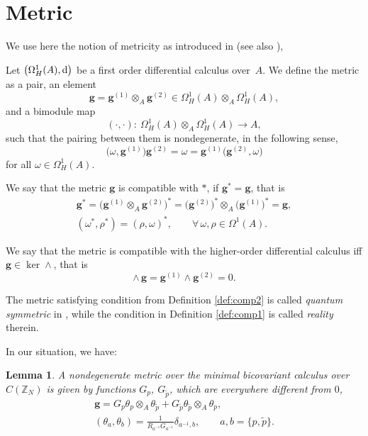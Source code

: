 \documentclass[pdftex]{sigma}
\numberwithin{equation}{section}
\newtheorem{Lemma}[Theorem]{Lemma}
\newcommand{\Z}{\mathbb{Z}}
\newcommand{\ip}{{\tilde{p}}}
\begin{document}
\section{Metric}
We use here the notion of metricity as introduced in \cite{BM14} (see also \cite{Si94}),
\begin{Definition}Let $\big(\Omega^1_H(A),{\rm d}\big)$ be a first order differential calculus over~$A$. We define the metric as a pair, an element
\[
\mathbf{g}=\mathbf{g}^{(1)}\otimes_A \mathbf{g}^{(2)}\in \Omega^1_H(A)\otimes_A\Omega^1_H(A),
\]
and a bimodule map
\[
(\cdot,\cdot)\colon \ \Omega^1_H(A)\otimes_A\Omega^1_H(A)\rightarrow A,
\] such that the pairing
between them is nondegenerate, in the following sense,
\begin{equation*}%
\big(\omega,\mathbf{g}^{(1)}\big)\mathbf{g}^{(2)}=\omega=\mathbf{g}^{(1)}\big(\mathbf{g}^{(2)},\omega\big)
\end{equation*}
for all $\omega\in\Omega^1_H(A)$.
\end{Definition}

\begin{Definition}\label{def:comp1}
We say that the metric $\mathbf{g}$ is compatible with $\ast$, if $\mathbf{g}^*=\mathbf{g}$, that is
\begin{gather*}
\mathbf{g}^\ast = \big( \mathbf{g}^{(1)}\otimes_A \mathbf{g}^{(2)} \big)^*
= \big(\mathbf{g}^{(2)}\big)^*\otimes_A \big(\mathbf{g}^{(1)}\big)^* = \mathbf{g}, \\
(\omega^*, \rho^*) = (\rho, \omega)^*, \qquad \forall\, \omega,\rho \in \Omega^1(A).
\end{gather*}
\end{Definition}
\begin{Definition}\label{def:comp2}
We say that the metric is compatible with the higher-order differential calculus iff
$\mathbf{g} \in \ker \wedge$, that is
\[ {\wedge}\, \mathbf{g} = \mathbf{g}^{(1)}\wedge \mathbf{g}^{(2)} = 0. \]
\end{Definition}

\begin{Remark}The metric satisfying condition from Definition \ref{def:comp2} is called {\it quantum symmetric} in \cite{BM14}, while the condition in Definition \ref{def:comp1} is called {\it reality} therein.
\end{Remark}

In our situation, we have:
\begin{Lemma}
\label{lemma_metric01}
A nondegenerate metric over the minimal bicovariant calculus over $C(\Z_N)$
is given by functions $G_p$, $G_\ip$, which are everywhere different from $0$,
\begin{gather}
 \mathbf{g} = G_p \theta_p \otimes_A \theta_\ip + G_\ip \theta_\ip \otimes_A \theta_p,\label{metric1} \\
 ( \theta_a,\theta_b)=\frac{1}{R_{a^{-1}} G_{a^{-1}}} \delta_{a^{-1},b} , \qquad a,b=\{p,\ip\}.\nonumber %
\end{gather}
\end{Lemma}
\end{document}
